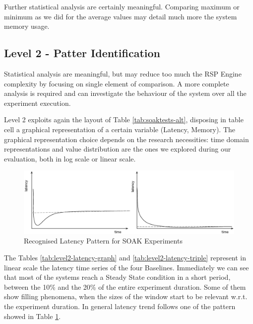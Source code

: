 Further statistical analysis are certainly meaningful. Comparing maximum or minimum as we did for the average values may detail much more the system memory usage. %

\subsection{Level 2 - Patter Identification}\label{sec:eval-level2}

Statistical analysis are meaningful, but may reduce too much the RSP Engine complexity by focusing on single element of comparison. A more complete analysis is required and \name can investigate the behaviour of the system over all the experiment execution.

Level 2 exploits again the layout of Table \ref{tab:soaktests-alt}, disposing in table cell a graphical representation of a certain variable (Latency, Memory). The graphical representation choice depends on the research necessities: time domain representations and value distribution are the ones we explored during our evaluation, both in log scale or linear scale.

\begin{figure}[h!tbp]
  \centering
	\includegraphics[width=\linewidth]{images/level2-pattern}
	\caption[\textsc{Analyser} Investigation Stack - Level 2 - Recognised Latency Patterns for SOAK Experiments]{Recognised Latency Pattern for SOAK Experiments} 
  	\label{fig:level2-pattern}
\end{figure}

The Tables \ref{tab:level2-latency-graph} and \ref{tab:level2-latency-triple} represent in linear scale the latency time series of the four Baselines. Immediately we can see that most of the systems reach a Steady State condition in a short period, between the 10\% and the 20\% of the entire experiment duration. Some of them show filling phenomena, when the sizes of the window start to be relevant w.r.t. the experiment duration. In general latency trend follows one of the pattern showed in Table \ref{fig:level2-pattern}. %

